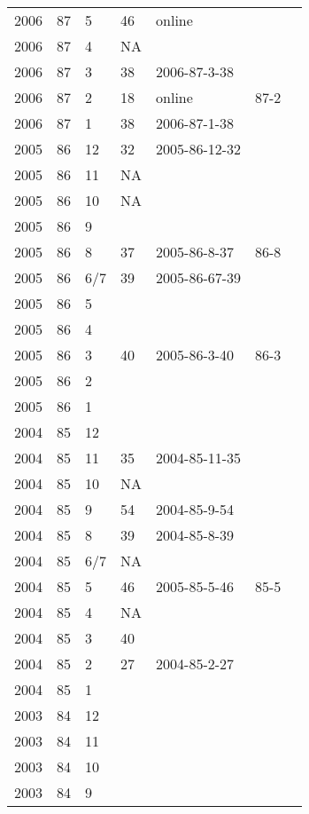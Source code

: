 \begin{longtable}{ |l|l|l|l|p{2.7cm}|l|p{2cm}| }
 2006 & 87 &     5 &      46 & online &  & \\
 2006 & 87 &     4 &      NA &  &  & \\
 2006 & 87 &     3 &      38 & 2006-87-3-38 &  & \\
 2006 & 87 &     2 &      18 & online & 87-2  & \\
 2006 & 87 &     1 &      38 & 2006-87-1-38 &  & \\
 2005 & 86 &    12 &      32 & 2005-86-12-32 &  & \\
 2005 & 86 &    11 &      NA &  &  & \\
 2005 & 86 &    10 &      NA &  &  & \\
 2005 & 86 &     9 &         &  &  & \\
 2005 & 86 &     8 &      37 & 2005-86-8-37 & 86-8  & \\
 2005 & 86 &   6/7 &      39 & 2005-86-67-39 &  & \\
 2005 & 86 &     5 &         &  &  & \\
 2005 & 86 &     4 &         & &  & \\
 2005 & 86 &     3 &      40 &  2005-86-3-40 & 86-3 & \\
 2005 & 86 &     2 &       &   &  & \\
 2005 & 86 &     1 &         &  &  & \\
 2004 & 85 &    12 &         &  &  & \\
 2004 & 85 &    11 &      35 & 2004-85-11-35 &  & \\
 2004 & 85 &    10 &      NA &  &  & \\
 2004 & 85 &     9 &      54 & 2004-85-9-54 &  & \\
 2004 & 85 &     8 &      39 & 2004-85-8-39 &  & \\
 2004 & 85 &   6/7 &      NA &  &  & \\
 2004 & 85 &     5 &      46 & 2005-85-5-46 & 85-5 & \\
 2004 & 85 &     4 &      NA &  &  & \\
 2004 & 85 &     3 &      40 &  &  & \\
 2004 & 85 &     2 &      27 & 2004-85-2-27 &  & \\
 2004 & 85 &     1 &         &  &  & \\
 2003 & 84 &    12 &         &  &  & \\
 2003 & 84 &    11 &         &  &  & \\
 2003 & 84 &    10 &         &  &  & \\
 2003 & 84 &     9 &         &  &  & \\

\end{longtable}
